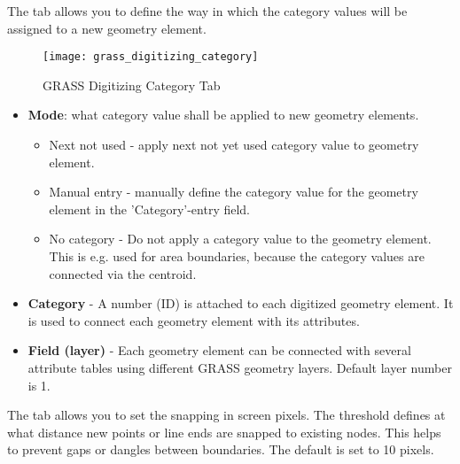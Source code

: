 The  tab allows you to define the way in which the category 
values will be assigned to a new geometry element.

\begin{figure}[h]
 \begin{center}
  \caption{GRASS Digitizing Category Tab \nixcaption}\label{fig:grass_digitizing_category}
  \texttt{[image: grass\_digitizing\_category]}
 \end{center}
\end{figure}

\begin{itemize}
\item \textbf{Mode}: what category value shall be applied to new geometry 
elements.
\begin{itemize}
\item Next not used - apply next not yet used category value to geometry
element.
\item Manual entry - manually define the category value for the geometry
element in the 'Category'-entry field.
\item No category - Do not apply a category value to the geometry element.
This is e.g. used for area boundaries, because the category values are
connected via the centroid.
\end{itemize}
\item \textbf{Category} - A number (ID) is attached to each digitized geometry
element. It is used to connect each geometry element with its attributes.
\item \textbf{Field (layer)} - Each geometry element can be connected with
several attribute tables using different GRASS geometry layers. Default layer
number is 1. 
\end{itemize}

\begin{Tip}\caption{\textsc{Creating an additional GRASS 'layer' with QGIS}}
\end{Tip}

\label{label_settingtab}

The  tab allows you to set the snapping in screen pixels. The
threshold defines at what distance new points or line ends are snapped to
existing nodes. This helps to prevent gaps or dangles between boundaries. The
default is set to 10 pixels.

